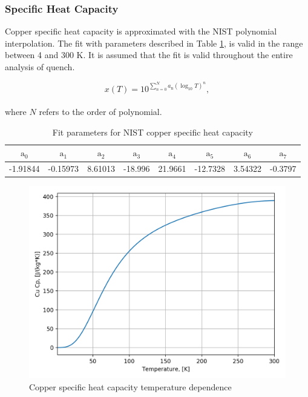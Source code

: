 \subsubsection{Specific Heat Capacity}
Copper specific heat capacity is approximated with the NIST polynomial interpolation. The fit with parameters described in Table \ref{table:nist_cu_cp_parameters}, is valid in the range between 4 and 300 K. It is assumed that the fit is valid throughout the entire analysis of quench.

\begin{equation}
    x(T) = 10^{\sum_{n=0}^{N} a_\text{n}(\log_\text{10}T)^{n}},
\end{equation}
\\
where $N$ refers to the order of polynomial.

\begin{table}[h!]
    \caption{Fit parameters for NIST copper specific heat capacity} 
    \vspace{-1.em} 
    \fontsize{10}{10}
    \selectfont 
    \renewcommand{\arraystretch}{1.5}
    \begin{center}
    \begin{tabular}{ cccccccc }  
    $\text{a}_0$ & $\text{a}_1$ & $\text{a}_2$ & $\text{a}_3$ & $\text{a}_4$ & $\text{a}_5$ & $\text{a}_6$ & $\text{a}_7$ \\
    \hline
    -1.91844 & -0.15973 & 8.61013 & -18.996 & 21.9661 & -12.7328 & 3.54322 & -0.3797 \\
    \hline 
    \end{tabular}
    \end{center}  
     \label{table:nist_cu_cp_parameters} 
 \end{table}

\begin{figure}[h!]
    \centering
    \includegraphics[width=0.49\linewidth]{figures/material_properties/Cu_Cp_plot.png}
    \caption{Copper specific heat capacity temperature dependence}
    \label{fig:cu_cp_plot}
\end{figure}
\newpage